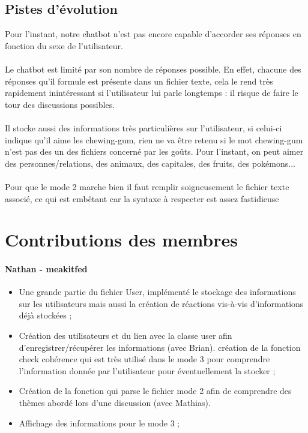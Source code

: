\documentclass[paper=a4, fontsize=11pt]{article}
\begin{document}
\subsection{Pistes d'évolution}

Pour l'instant, notre chatbot n'est pas encore capable d'accorder ses réponses en fonction du sexe de l'utilisateur.
\paragraph{} Le chatbot est limité par son nombre de réponses possible. En effet, chacune des réponses qu’il formule est présente dans un fichier texte, cela le rend très rapidement inintéressant si l’utilisateur lui parle longtemps : il risque de faire le tour des discussions possibles. 
\paragraph{} Il stocke aussi des informations très particulières sur l’utilisateur, si celui-ci indique qu’il aime les chewing-gum, rien ne va être retenu si le mot chewing-gum n’est pas des un des fichiers concerné par les goûts. Pour l’instant, on peut aimer des personnes/relations, des animaux, des capitales, des fruits, des pokémons...
\paragraph{} Pour que le mode 2 marche bien il faut remplir soigneusement le fichier texte associé, ce qui est embêtant car la syntaxe à respecter est assez fastidieuse 

\vspace{0.5cm}

\section{Contributions des membres}

\paragraph{Nathan - meakitfed}
\begin{itemize}
\item Une grande partie du fichier User, implémenté le stockage des informations sur les utilisateurs mais aussi la création de réactions vis-à-vis d'informations déjà stockées ;
\item Création des utilisateurs et du lien avec la classe user afin d’enregistrer/récupérer les informations (avec Brian).
création de la fonction check cohérence qui est très utilisé dans le mode 3 pour comprendre l’information donnée par l’utilisateur pour éventuellement la stocker ;
\item Création de la fonction qui parse le fichier mode 2 afin de comprendre des thèmes abordé lors d’une discussion (avec Mathias).
\item Affichage des informations pour le mode 3 ;
\end{itemize}
\end{document}
